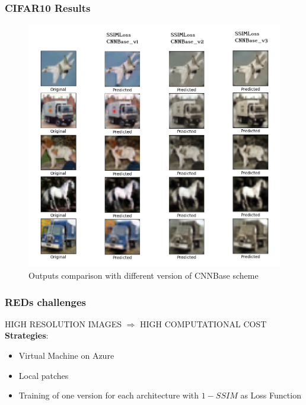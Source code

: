 \documentclass [handout] {beamer}
\begin{document}
\begin{frame}
	\frametitle{CIFAR10 Results}
	\begin{figure}[hptb]
	\centering
	\includegraphics[scale=0.32]{CNNBase_comparison.png}
	\caption{Outputs comparison with different version of CNNBase scheme}
	\label{CNNBase_comparison}
	\end{figure}
\end{frame}


\begin{frame}
	\frametitle{REDs challenges}
	HIGH RESOLUTION IMAGES $\Rightarrow$ HIGH COMPUTATIONAL COST \\
	
	\medskip
	\textbf{Strategies}:
	\begin{itemize}
		\item Virtual Machine on Azure
		\item Local patches 
		\item Training of one version for each architecture with $1-SSIM$ as Loss Function  
	\end{itemize}
\end{frame}
\end{document}
